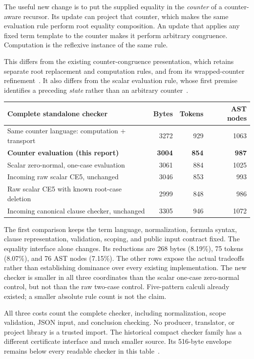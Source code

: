\documentclass[11pt,letterpaper]{article}
\theoremstyle{definition}
\begin{document}
The useful new change is to put the supplied equality in the
\emph{counter} of a counter-aware recursor. Its update can project that
counter, which makes the same evaluation rule perform root equality
composition. An update that applies any fixed term template to the
counter makes it perform arbitrary congruence. Computation is the
reflexive instance of the same rule.

This differs from the existing counter-congruence presentation, which
retains separate root replacement and computation rules, and from its
wrapped-counter refinement~\cite{counter,wrapped}. It also differs from
the scalar evaluation rule, whose first premise identifies a preceding
\emph{state} rather than an arbitrary counter~\cite{eval,iteration}.

\begin{center}\small
\begin{tabular}{@{}p{.44\linewidth}rrr@{}}
\toprule
Complete standalone checker & Bytes & Tokens & AST nodes\\
\midrule
Same counter language: computation + transport & 3272 & 929 & 1063\\
\textbf{Counter evaluation (this report)} & \textbf{3004} & \textbf{854} & \textbf{987}\\
Scalar zero-normal, one-case evaluation & 3061 & 884 & 1025\\
Incoming raw scalar CE5, unchanged & 3046 & 853 & 993\\
Raw scalar CE5 with known root-case deletion & 2999 & 848 & 986\\
Incoming canonical clause checker, unchanged & 3305 & 946 & 1072\\
\bottomrule
\end{tabular}
\end{center}

The first comparison keeps the term language, normalization, formula
syntax, clause representation, validation, scoping, and public input
contract fixed. The equality interface alone changes. Its reductions
are 268 bytes (8.19\%), 75 tokens (8.07\%), and 76 AST nodes (7.15\%).
The other rows expose the actual tradeoffs rather than establishing
dominance over every existing implementation. The new checker is
smaller in all three coordinates than the scalar one-case zero-normal
control, but not than the raw two-case control. Five-pattern calculi
already existed; a smaller absolute rule count is not the claim.

All three costs count the complete checker, including normalization,
scope validation, JSON input, and conclusion checking. No producer,
translator, or project library is a trusted import. The historical
compact checker family has a different certificate interface and much
smaller source. Its 516-byte envelope remains below every readable
checker in this table~\cite{canonical}.
\end{document}
